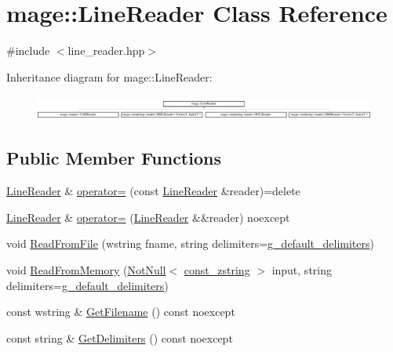 \hypertarget{classmage_1_1_line_reader}{}\section{mage\+:\+:Line\+Reader Class Reference}
\label{classmage_1_1_line_reader}


{\ttfamily \#include $<$line\+\_\+reader.\+hpp$>$}

Inheritance diagram for mage\+:\+:Line\+Reader\+:\begin{figure}[H]
\begin{center}
\leavevmode
\includegraphics[height=0.821114cm]{classmage_1_1_line_reader}
\end{center}
\end{figure}
\subsection*{Public Member Functions}
\begin{DoxyCompactItemize}
\item 
\mbox{\hyperlink{classmage_1_1_line_reader}{Line\+Reader}} \& \mbox{\hyperlink{classmage_1_1_line_reader_a2247078d0b5602f9a9a6b74019832faf}{operator=}} (const \mbox{\hyperlink{classmage_1_1_line_reader}{Line\+Reader}} \&reader)=delete
\item 
\mbox{\hyperlink{classmage_1_1_line_reader}{Line\+Reader}} \& \mbox{\hyperlink{classmage_1_1_line_reader_a3ba691cb32a1ab5dcbe75498068c1b86}{operator=}} (\mbox{\hyperlink{classmage_1_1_line_reader}{Line\+Reader}} \&\&reader) noexcept
\item 
void \mbox{\hyperlink{classmage_1_1_line_reader_a6ee0c53351656ac4cd92db1d7c372cff}{Read\+From\+File}} (wstring fname, string delimiters=\mbox{\hyperlink{namespacemage_aa161198415efd9349da6187663250aea}{g\+\_\+default\+\_\+delimiters}})
\item 
void \mbox{\hyperlink{classmage_1_1_line_reader_a5aa9068792817b6d6dc840a44b788159}{Read\+From\+Memory}} (\mbox{\hyperlink{namespacemage_a8769f9d670d6b585ea306cb1062af94b}{Not\+Null}}$<$ \mbox{\hyperlink{namespacemage_abfd9206dc607ceb5d13ec68bf075a5c0}{const\+\_\+zstring}} $>$ input, string delimiters=\mbox{\hyperlink{namespacemage_aa161198415efd9349da6187663250aea}{g\+\_\+default\+\_\+delimiters}})
\item 
const wstring \& \mbox{\hyperlink{classmage_1_1_line_reader_a682ed8030c99a62d4409a01f9efa6d6b}{Get\+Filename}} () const noexcept
\item 
const string \& \mbox{\hyperlink{classmage_1_1_line_reader_aa00e1e27b614e11ec9f70e52d0bac551}{Get\+Delimiters}} () const noexcept
\end{DoxyCompactItemize}
